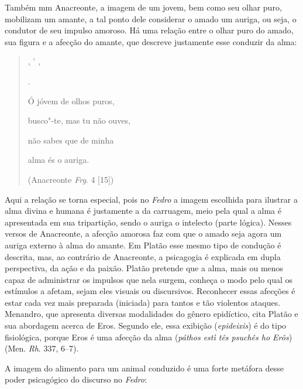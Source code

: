  

 

Também mm Anacreonte, a imagem de um jovem, bem como seu olhar puro,
mobilizam um amante, a tal ponto dele considerar o amado um auriga, ou
seja, o condutor de seu impulso amoroso. Há uma relação entre o olhar
puro do amado, sua figura e a afecção do amante, que descreve justamente
esse conduzir da alma:

 

\begin{quote}
   

 ,  '  ,

    

 .

 

Ó jóvem de olhos puros,

busco"-te, mas tu não ouves,

não sabes que de minha

alma és o auriga.

 

(Anacreonte \emph{Frg}. 4 [15])
\end{quote}

 

Aqui a relação se torna especial, pois no \emph{Fedro} a imagem
escolhida para ilustrar a alma divina e humana é justamente a da
carruagem, meio pela qual a alma é apresentada em sua tripartição, sendo
o auriga o intelecto (parte lógica). Nesses versos de Anacreonte, a
afecção amorosa faz com que o amado seja agora um auriga externo à alma
do amante. Em Platão esse mesmo tipo de condução é descrita, mas, ao
contrário de Anacreonte, a psicagogia é explicada em dupla perspectiva,
da ação e da paixão. Platão pretende que a alma, mais ou menos capaz de
administrar os impulsos que nela surgem, conheça o modo pelo qual os
estímulos a afetam, sejam eles visuais ou discursivos. Reconhecer essas
afecções é estar cada vez mais preparada (iniciada) para tantos e tão
violentos ataques. Menandro, que apresenta diversas modalidades do
gênero epidíctico, cita Platão e sua abordagem acerca de Eros. Segundo
ele, essa exibição (\emph{epideixis}) é do tipo fisiológica, porque Eros
é uma afecção da alma (\emph{páthos estì tês psuchês ho Erôs})
(Men. \emph{Rh}. 337, 6--7).

A imagem do alimento para um animal conduzido é uma forte metáfora desse
poder psicagógico do discurso no \emph{Fedro}:

